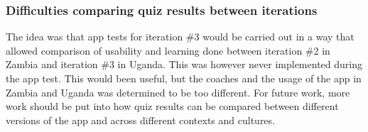 \subsubsection{Difficulties comparing quiz results between iterations}

The idea was that app tests for iteration \#3 would be carried out in a way that allowed comparison of usability and learning done between iteration \#2 in Zambia and iteration \#3 in Uganda. This was however never implemented during the app test. This would been useful, but the coaches and the usage of the app in Zambia and Uganda was determined to be too different. For future work, more work should be put into how quiz results can be compared between different versions of the app and across different contexts and cultures.
